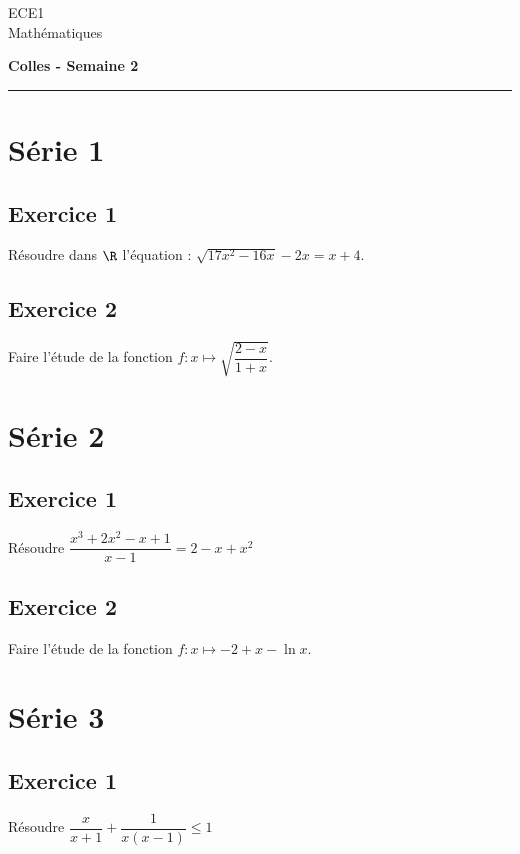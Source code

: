 \documentclass[11pt]{article}%
\begin{document}
\begin{flushleft}
ECE1 \\
Mathématiques
\end{flushleft}

\begin{center}
\textbf{\Large{Colles - Semaine 2}}
\end{center}

\hrule

\vspace*{0,2cm}

\section{Série 1}

\subsection*{Exercice 1}
\noindent
  Résoudre dans $\R$ l'équation : $\sqrt{17x^2-16x} -2x = x+4$.


\subsection*{Exercice 2}
\noindent
Faire l'étude de la fonction $f:x\mapsto \sqrt{\dfrac{2-x}{1+x}}$.



\section{Série 2}

\subsection*{Exercice 1}
\noindent
Résoudre $\dfrac{x^3 + 2x^2 -x +1}{x-1} = 2 - x +x^2$



\subsection*{Exercice 2}
\noindent
Faire l'étude de la fonction $f:x\mapsto -2+x-\ln x$.



\section{Série 3}

\subsection*{Exercice 1}
\noindent
Résoudre $\dfrac{x}{x+1}+ \dfrac{1}{x(x-1)}\leq 1$ 
\end{document}
